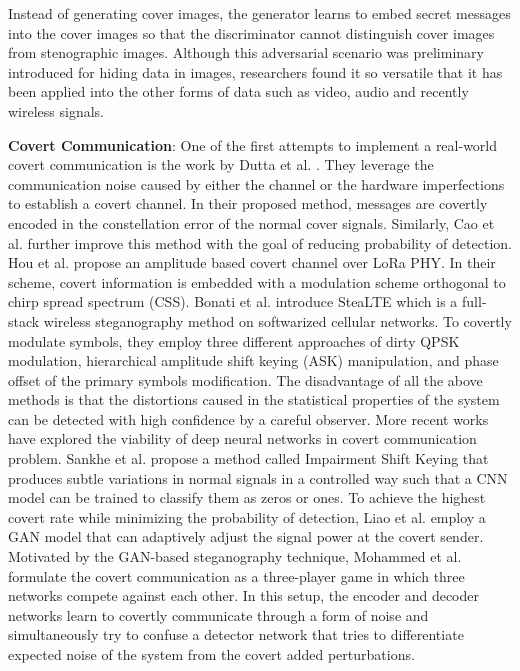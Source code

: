Instead of generating cover images, the generator learns to embed secret messages into the cover images so that the discriminator cannot distinguish cover images from stenographic images. Although this adversarial scenario was preliminary introduced for hiding data in images, researchers found it so versatile that it has been applied into the other forms of data such as video, audio and recently wireless signals.


\textbf{Covert Communication}: One of the first attempts to implement a real-world covert communication is the work by Dutta et al. \cite{dutta2012secret}. They leverage the communication noise caused by either the channel or the hardware imperfections to establish a covert channel. In their proposed method, messages are covertly encoded in the constellation error of the normal cover signals. Similarly, Cao et al. \cite{cao2018wireless} further improve this method with the goal of reducing probability of detection. Hou et al. \cite{hou2020cloaklora} propose an amplitude based covert channel over LoRa PHY. In their scheme, covert information is embedded with a modulation scheme orthogonal to chirp spread spectrum (CSS). Bonati et al. \cite{bonati2021stealte} introduce SteaLTE which is a full-stack wireless steganography method on softwarized cellular networks. To covertly modulate symbols, they employ three different approaches of dirty QPSK modulation, hierarchical amplitude shift keying (ASK) manipulation, and phase offset of the primary symbols modification. The disadvantage of all the above methods is that the distortions caused in the statistical properties of the system can be detected with high confidence by a careful observer. More recent works have explored the viability of deep neural networks in covert communication problem. Sankhe et al. \cite{sankhe2019impairment} propose a method called Impairment Shift Keying that produces subtle variations in normal signals in a controlled way such that a CNN model can be trained to classify them as zeros or ones. To achieve the highest covert rate while minimizing the probability of detection, Liao et al. \cite{liao2020generative} employ a GAN model that can adaptively adjust the signal power at the covert sender. Motivated by the GAN-based steganography technique, Mohammed et al. \cite{mohammed2021adversarial} formulate the covert communication as a three-player game in which three networks compete against each other. In this setup, the encoder and decoder networks learn to covertly communicate through a form of noise and simultaneously try to confuse a detector network that tries to differentiate expected noise of the system from the covert added perturbations.


